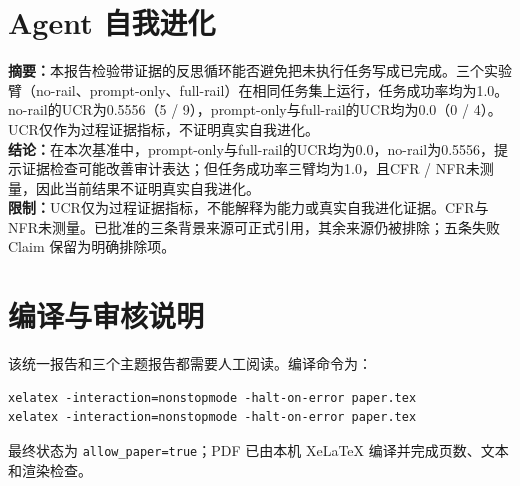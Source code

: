 \documentclass[UTF8]{ctexart}
\begin{document}
\section{Agent 自我进化}
\textbf{摘要：}本报告检验带证据的反思循环能否避免把未执行任务写成已完成。三个实验臂（no-\allowbreak{}rail、prompt-\allowbreak{}only、full-\allowbreak{}rail）在相同任务集上运行，任务成功率均为1.0。no-\allowbreak{}rail的UCR为0.5556（5 / 9），prompt-\allowbreak{}only与full-\allowbreak{}rail的UCR均为0.0（0 / 4）。UCR仅作为过程证据指标，不证明真实自我进化。\\
\textbf{结论：}在本次基准中，prompt-\allowbreak{}only与full-\allowbreak{}rail的UCR均为0.0，no-\allowbreak{}rail为0.5556，提示证据检查可能改善审计表达；但任务成功率三臂均为1.0，且CFR / NFR未测量，因此当前结果不证明真实自我进化。\\
\textbf{限制：}UCR仅为过程证据指标，不能解释为能力或真实自我进化证据。CFR与NFR未测量。已批准的三条背景来源可正式引用，其余来源仍被排除；五条失败 Claim 保留为明确排除项。
\section{编译与审核说明}
该统一报告和三个主题报告都需要人工阅读。编译命令为：
\begin{verbatim}
xelatex -interaction=nonstopmode -halt-on-error paper.tex
xelatex -interaction=nonstopmode -halt-on-error paper.tex
\end{verbatim}
最终状态为 \texttt{allow\_paper=true}；PDF 已由本机 XeLaTeX 编译并完成页数、文本和渲染检查。
\end{document}
